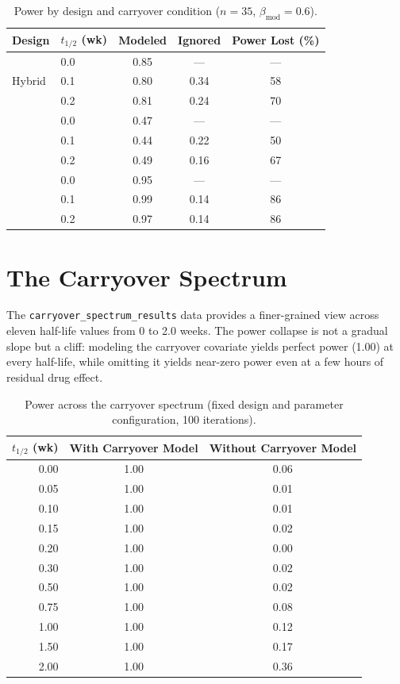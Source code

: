 \documentclass[11pt]{article}
\begin{document}
\begin{table}[ht]
\centering
\caption{Power by design and carryover condition
($n=35$, $\beta_{\mathrm{mod}}=0.6$).}
\label{tab:power35bm06}
\begin{tabular}{ll ccc}
\toprule
Design & $t_{1/2}$ (wk) & Modeled & Ignored
  & Power Lost (\%) \\
\midrule
\multirow{3}{*}{Hybrid}
  & 0.0 & 0.85 & ---   & --- \\
  & 0.1 & 0.80 & 0.34  & 58 \\
  & 0.2 & 0.81 & 0.24  & 70 \\
\addlinespace
\multirow{3}{*}{Crossover}
  & 0.0 & 0.47 & ---   & --- \\
  & 0.1 & 0.44 & 0.22  & 50 \\
  & 0.2 & 0.49 & 0.16  & 67 \\
\addlinespace
\multirow{3}{*}{OL+BDC}
  & 0.0 & 0.95 & ---   & --- \\
  & 0.1 & 0.99 & 0.14  & 86 \\
  & 0.2 & 0.97 & 0.14  & 86 \\
\bottomrule
\end{tabular}
\end{table}

\section{The Carryover Spectrum}

The \texttt{carryover\_spectrum\_results} data provides a
finer-grained view across eleven half-life values from
0 to 2.0 weeks.
The power collapse is not a gradual slope but a cliff:
modeling the carryover covariate yields perfect power (1.00)
at every half-life, while omitting it yields near-zero power
even at a few hours of residual drug effect.

\begin{table}[ht]
\centering
\caption{Power across the carryover spectrum
(fixed design and parameter configuration, 100 iterations).}
\label{tab:spectrum}
\begin{tabular}{r cc}
\toprule
$t_{1/2}$ (wk) & With Carryover Model
  & Without Carryover Model \\
\midrule
0.00  & 1.00 & 0.06 \\
0.05  & 1.00 & 0.01 \\
0.10  & 1.00 & 0.01 \\
0.15  & 1.00 & 0.02 \\
0.20  & 1.00 & 0.00 \\
0.30  & 1.00 & 0.02 \\
0.50  & 1.00 & 0.02 \\
0.75  & 1.00 & 0.08 \\
1.00  & 1.00 & 0.12 \\
1.50  & 1.00 & 0.17 \\
2.00  & 1.00 & 0.36 \\
\bottomrule
\end{tabular}
\end{table}
\end{document}
